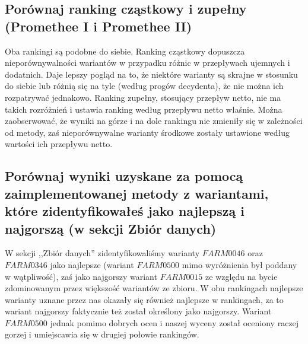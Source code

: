 \documentclass[11pt]{article}
\begin{document}
\subsection{Porównaj ranking cząstkowy i zupełny (Promethee I i Promethee II)}
Oba rankingi są podobne do siebie. Ranking cząstkowy dopuszcza nieporównywalności wariantów w przypadku różnic w przepływach ujemnych i dodatnich. Daje lepszy pogląd na to, że niektóre warianty są skrajne w stosunku do siebie lub różnią się na tyle (według progów decydenta), że nie można ich rozpatrywać jednakowo. Ranking zupełny, stosujący przepływ netto, nie ma takich rozróżnień i ustawia ranking według przepływu netto właśnie. Można zaobserwować, że wyniki na górze i na dole rankingu nie zmieniły się w zależności od metody, zaś nieporównywalne warianty środkowe zostały ustawione według wartości ich przepływu netto.

\subsection{Porównaj wyniki uzyskane za pomocą zaimplementowanej metody z wariantami, które zidentyfikowałeś jako najlepszą i najgorszą (w sekcji Zbiór danych)}
W sekcji ,,Zbiór danych'' zidentyfikowaliśmy warianty $FARM0046$ oraz $FARM0346$ jako najlepsze (wariant $FARM0500$ mimo wyróżnienia był poddany w wątpliwość), zaś jako najgorszy wariant $FARM0015$ ze względu na bycie zdominowanym przez większość wariantów ze zbioru. W obu rankingach najlepsze warianty uznane przez nas okazały się również najlepsze w rankingach, za to wariant najgorszy faktycznie też został określony jako najgorszy. Wariant $FARM0500$ jednak pomimo dobrych ocen i naszej wyceny został oceniony raczej gorzej i umiejscawia się w drugiej połowie rankingów.
\end{document}
